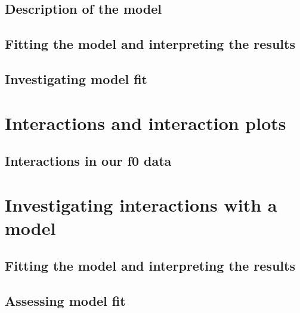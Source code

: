\documentclass[
]{book}
\begin{document}
\hypertarget{description-of-the-model-3}{%
\subsection{Description of the model}\label{description-of-the-model-3}}

\hypertarget{fitting-the-model-and-interpreting-the-results}{%
\subsection{Fitting the model and interpreting the results}\label{fitting-the-model-and-interpreting-the-results}}

\hypertarget{investigating-model-fit}{%
\subsection{Investigating model fit}\label{investigating-model-fit}}

\hypertarget{interactions-and-interaction-plots}{%
\section{Interactions and interaction plots}\label{interactions-and-interaction-plots}}

\hypertarget{interactions-in-our-f0-data}{%
\subsection{Interactions in our f0 data}\label{interactions-in-our-f0-data}}

\hypertarget{investigating-interactions-with-a-model}{%
\section{Investigating interactions with a model}\label{investigating-interactions-with-a-model}}

\hypertarget{fitting-the-model-and-interpreting-the-results-1}{%
\subsection{Fitting the model and interpreting the results}\label{fitting-the-model-and-interpreting-the-results-1}}

\hypertarget{assessing-model-fit}{%
\subsection{Assessing model fit}\label{assessing-model-fit}}
\end{document}
